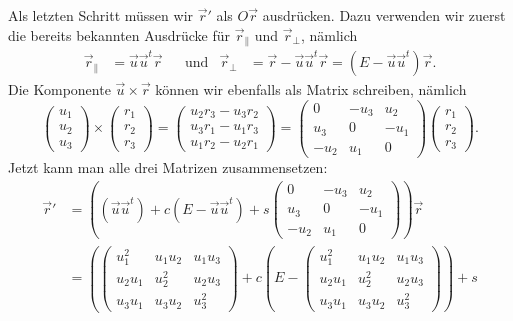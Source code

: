 \begin{diskussion}
Als letzten Schritt müssen wir $\vec r'$ als $O\vec r$ ausdrücken.
Dazu verwenden wir zuerst die bereits bekannten Ausdrücke für $\vec r_{\|}$
und $\vec r_{\perp}$, nämlich
\begin{align*}
\vec r_{\|}
&=
\vec u\vec u^t\vec r
&
&\text{und}&
\vec r_{\perp}
&=
\vec r - \vec u\vec u^t\vec r
=
(E-\vec u\vec u^t)\vec r.
\end{align*}
Die Komponente $\vec u\times \vec r$ können wir ebenfalls als Matrix schreiben,
nämlich
\[
\begin{pmatrix}u_1\\u_2\\u_3\end{pmatrix}
\times
\begin{pmatrix}r_1\\r_2\\r_3\end{pmatrix}
=
\begin{pmatrix}
u_2r_3-u_3r_2\\
u_3r_1-u_1r_3\\
u_1r_2-u_2r_1
\end{pmatrix}
=
\begin{pmatrix}
   0&-u_3& u_2\\
 u_3&   0&-u_1\\
-u_2& u_1&   0
\end{pmatrix}
\begin{pmatrix}r_1\\r_2\\r_3\end{pmatrix}.
\]
Jetzt kann man alle drei Matrizen zusammensetzen:
\begin{align*}
\vec r'
&=
\left(
(\vec u\vec u^t) + c(E-\vec u\vec u^t) + 
s
\begin{pmatrix}
   0&-u_3& u_2\\
 u_3&   0&-u_1\\
-u_2& u_1&   0
\end{pmatrix}
\right)
\vec r
\\
&=
\left(
\begin{pmatrix}
u_1^2&u_1u_2&u_1u_3\\
u_2u_1&u_2^2&u_2u_3\\
u_3u_1&u_3u_2&u_3^2
\end{pmatrix}
+c
\left(E-
\begin{pmatrix}
u_1^2&u_1u_2&u_1u_3\\
u_2u_1&u_2^2&u_2u_3\\
u_3u_1&u_3u_2&u_3^2
\end{pmatrix}
\right)
+s

\end{align*}
\end{diskussion}
